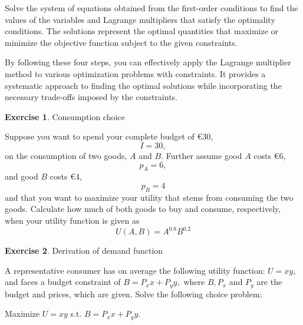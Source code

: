 \documentclass[
  12pt,
  oneside]{book}
\theoremstyle{definition}
\theoremstyle{definition}
\theoremstyle{definition}
\newtheorem{exercise}{Exercise}[chapter]
\theoremstyle{definition}
\theoremstyle{remark}
\begin{document}
Solve the system of equations obtained from the first-order conditions to find the values of the variables and Lagrange multipliers that satisfy the optimality conditions. The solutions represent the optimal quantities that maximize or minimize the objective function subject to the given constraints.

By following these four steps, you can effectively apply the Lagrange multiplier method to various optimization problems with constraints. It provides a systematic approach to finding the optimal solutions while incorporating the necessary trade-offs imposed by the constraints.

\begin{exercise}
\protect\hypertarget{exr:cchoice}{}\label{exr:cchoice}Consumption choice

Suppose you want to spend your complete budget of €30, \[I=30,\] on the
consumption of two goods, \(A\) and \(B\). Further assume good \(A\) costs €6, \[p_A=6,\]
and good \(B\) costs €4, \[p_B=4\] and that you want to maximize your utility that
stems from consuming the two goods.
Calculate how much of both goods to buy and consume, respectively, when your utility function
is given as \[U(A,B)=A^{0.8}B^{0.2}\]
\end{exercise}

\begin{exercise}
\protect\hypertarget{exr:derofdemand}{}\label{exr:derofdemand}Derivation of demand function

A representative consumer has on average the following utility function:
\(U=x y,\) and faces a budget constraint of \(B=P_{x} x+P_{y} y,\) where \(B, P_{x}\)
and \(P_{y}\) are the budget and prices, which are given. Solve the following choice problem:

Maximize \(U=x y\) s.t. \(B=P_{x} x+P_{y} y\).
\end{exercise}
\end{document}
